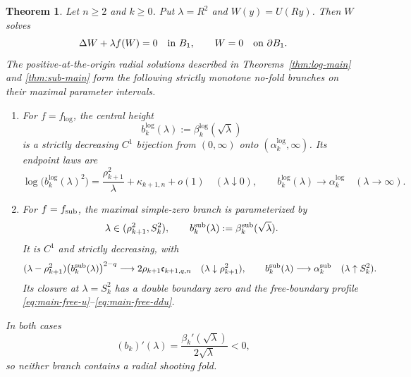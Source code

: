 \documentclass[11pt]{article}
\newtheorem{theorem}{Theorem}[section]
\begin{document}
\begin{theorem}\label{thm:branch-main}
Let $n\ge2$ and $k\ge0$. Put $\lambda=R^2$ and $W(y)=U(Ry)$. Then $W$ solves
\begin{equation}\label{eq:unit-parameter}
 \Delta W+\lambda f(W)=0\quad\hbox{in }B_1,
 \qquad W=0\quad\hbox{on }\partial B_1.
\end{equation}
{The positive-at-the-origin radial solutions described in
Theorems~\ref{thm:log-main} and \ref{thm:sub-main} form the following
strictly monotone no-fold branches on their maximal parameter intervals.}
\begin{enumerate}[label=\textup{(\alph*)}]
\item For $f=f_{\log}$, the central height
\[
 b_k^{\log}(\lambda):=\beta_k^{\log}(\sqrt\lambda)
\]
is a strictly decreasing $C^1$ bijection from $(0,\infty)$ onto
$(\alpha_k^{\log},\infty)$. Its endpoint laws are
\[
 \log\bigl(b_k^{\log}(\lambda)^2\bigr)
 =\frac{\rho_{k+1}^2}{\lambda}+\kappa_{k+1,n}+o(1)
 \quad(\lambda\downarrow0),
 \qquad
 b_k^{\log}(\lambda)\to\alpha_k^{\log}
 \quad(\lambda\to\infty).
\]
\item For $f=f_{\rm sub}$, the maximal simple-zero branch is
parameterized by
\[
 \lambda\in(\rho_{k+1}^2,S_k^2),
 \qquad
 b_k^{\rm sub}(\lambda):=\beta_k^{\rm sub}(\sqrt\lambda).
\]
It is $C^1$ and strictly decreasing, with
\begin{align*}
 (\lambda-\rho_{k+1}^2)
 \bigl(b_k^{\rm sub}(\lambda)\bigr)^{2-q}
 \longrightarrow2\rho_{k+1}\mathfrak c_{k+1,q,n}
 \quad({\lambda\downarrow\rho_{k+1}^2}),\qquad
 b_k^{\rm sub}(\lambda)\longrightarrow\alpha_k^{\rm sub}
 \quad(\lambda\uparrow S_k^2).
\end{align*}
Its closure at $\lambda=S_k^2$ has a double boundary zero and the
free-boundary profile \eqref{eq:main-free-u}--\eqref{eq:main-free-ddu}.
\end{enumerate}
In both cases
\begin{equation}\label{eq:branch-derivative}
 (b_k)'(\lambda)=\frac{\beta_k'(\sqrt\lambda)}{2\sqrt\lambda}<0,
\end{equation}
so neither branch contains a radial shooting fold.
\end{theorem}
\end{document}
